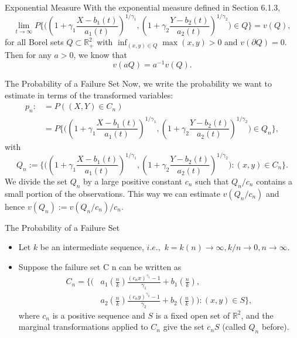 \documentclass[11pt]{beamer}
\begin{document}
\begin{frame}{Exponential Measure}
With the exponential measure defined in Section 6.1.3, 
\begin{displaymath}
\lim_{t\to \infty} P\{  \big(  (1+\gamma_1 \dfrac{X-b_1(t)}{a_1(t)})^{1/\gamma_1}, (1+\gamma_2 \dfrac{Y-b_2(t)}{a_2(t)})^{1/\gamma_2} \big) \in Q\}=v(Q),
\end{displaymath}
for all Borel sets $Q\subset \mathbb{R}_{+}^2$ with $\inf_{(x,y)\in Q} \max(x,y)>0$ and $v(\partial Q)=0$. Then for any $a>0$, we know that
\begin{displaymath}
v(aQ)=a^{-1}v(Q).
\end{displaymath}
\end{frame}

\begin{frame}{The Probability of a Failure Set}
Now, we write the probability we want to estimate in terms of the transformed variables:
\begin{equation}\tag{8.1.6}
\begin{split}
p_n: &=P((X,Y)\in C_n)\\
		&=P\{ \big(    (1+\gamma_1 \dfrac{X-b_1(t)}{a_1(t)})^{1/\gamma_1}, (1+\gamma_2 \dfrac{Y-b_2(t)}{a_2(t)})^{1/\gamma_2}            \big)\in Q_n\},
\end{split}
\end{equation}
with
\begin{displaymath}
Q_n:=\{  \big(    (1+\gamma_1 \dfrac{X-b_1(t)}{a_1(t)})^{1/\gamma_1}, (1+\gamma_2 \dfrac{Y-b_2(t)}{a_2(t)})^{1/\gamma_2}            \big):(x,y)\in C_n        \}.
\end{displaymath}
We divide the set $Q_n$ by a large positive constant $c_n$ such that $Q_n/c_n$ contains a small portion of the
observations. This way we can estimate $v(Q_n/c_n)$ and hence $v(Q_n):=v(Q_n/c_n)/c_n$.
\end{frame}


\begin{frame}{The Probability of a Failure Set}
\begin{itemize}
\item Let $k$ be an intermediate sequence, $i.e., $ $k=k(n)\to \infty, k/n \to 0,n\to \infty$.
\item Suppose the failure set C n can be written as
\begin{equation}\tag{8.1.9}
\begin{split}
C_n=\{\big( & a_1(\frac{n}{k})\frac{(c_nx)^{\gamma_1}-1}{\gamma_1}+b_1(\frac{n}{k}),\\
  & a_2(\frac{n}{k})\frac{(c_ny)^{\gamma_2}-1}{\gamma_2}+b_2(\frac{n}{k})\big ): (x,y) \in S \},
\end{split}
\end{equation}
where $c_n$ is a positive sequence and $S$ is a fixed open set of $\mathbb{R}^2$, and the marginal transformations applied to $C_n$ give the set $c_n S$ (called $Q_n$ before).
\end{itemize}
\end{frame}
\end{document}
